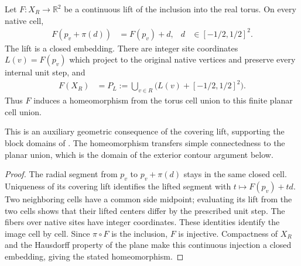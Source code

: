 \begin{lemma}%
    \label{thm:peps_torus_region_planar_lift}
    \leanok
    Let $F:X_R\to\mathbb R^2$ be a continuous lift of the inclusion
    into the real torus. On every native cell,
    \begin{align}
        F(p_v+\pi(d)) & =F(p_v)+d,
                      & d          & \in[-1/2,1/2]^2.
    \end{align}
    The lift is a closed embedding. There are integer site coordinates
    $L(v)=F(p_v)$ which project to the original native vertices and
    preserve every internal unit step, and
    \begin{align}
        F(X_R) & =P_L:=\bigcup_{v\in R}
        \bigl(L(v)+[-1/2,1/2]^2\bigr).
    \end{align}
    Thus $F$ induces a homeomorphism from the torus cell union
    to this finite planar cell union.

    This is an auxiliary geometric consequence of the covering lift,
    supporting the block domains of \cite[\S6.3]{Schuch2010PEPS}.
    The homeomorphism transfers simple connectedness to the planar
    union, which is the domain of the exterior contour argument below.
\end{lemma}
\begin{proof}\leanok
    The radial segment from $p_v$ to $p_v+\pi(d)$ stays in the same
    closed cell. Uniqueness of its covering lift identifies the lifted
    segment with $t\mapsto F(p_v)+td$. Two neighboring cells have a
    common side midpoint; evaluating its lift from the two cells shows
    that their lifted centers differ by the prescribed unit step.
    The fibers over native sites have integer coordinates. These
    identities identify the image cell by cell. Since $\pi\circ F$
    is the inclusion, $F$ is injective. Compactness of $X_R$ and the
    Hausdorff property of the plane make this continuous injection a
    closed embedding, giving the stated homeomorphism.
\end{proof}

